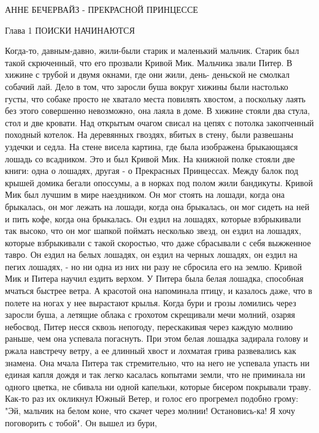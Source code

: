                                               АННЕ БЕЧЕРВАЙЗ -
                                              ПРЕКРАСНОЙ ПРИНЦЕССЕ

        Глава 1
        ПОИСКИ НАЧИНАЮТСЯ

    Когда-то, давным-давно, жили-были старик и маленький мальчик. 
Старик был такой скрюченный, что его прозвали Кривой Мик. Мальчика 
звали Питер. В хижине с трубой и двумя окнами, где они жили, день-
деньской не смолкал собачий лай. Дело в том, что заросли буша вокруг 
хижины были настолько густы, что собаке просто не хватало места 
повилять хвостом, а поскольку лаять без этого совершенно невозможно, 
она лаяла в доме.
    В хижине стояли два стула, стол и две кровати. Над открытым очагом 
свисал на цепях с потолка закопченный походный котелок. На деревянных 
гвоздях, вбитых в стену, были развешаны уздечки и седла. На стене 
висела картина, где была изображена брыкающаяся лошадь со всадником. 
Это и был Кривой Мик. На книжной полке стояли две книги: одна о 
лошадях, другая - о Прекрасных Принцессах. Между балок под крышей 
домика бегали опоссумы, а в норках под полом жили бандикуты.
    Кривой Мик был лучшим в мире наездником. Он мог стоять на лошади, 
когда она брыкалась, он мог лежать на лошади, когда она брыкалась, он 
мог сидеть на ней и пить кофе, когда она брыкалась. Он ездил на 
лошадях, которые взбрыкивали так высоко, что он мог шапкой поймать 
несколько звезд, он ездил на лошадях, которые взбрыкивали с такой 
скоростью, что даже сбрасывали с себя выжженное тавро. Он ездил на 
белых лошадях, он ездил на черных лошадях, он ездил на пегих лошадях, 
- но ни одна из них ни разу не сбросила его на землю. Кривой Мик и 
Питера научил ездить верхом.
    У Питера была белая лошадка, способная мчаться быстрее ветра. А 
красотой она напоминала птицу, и казалось даже, что в полете на ногах 
у нее вырастают крылья. Когда бури и грозы ломились через заросли 
буша, а летящие облака с грохотом скрещивали мечи молний, озаряя 
небосвод, Питер несся сквозь непогоду, перескакивая через каждую 
молнию раньше, чем она успевала погаснуть. При этом белая лошадка 
задирала голову и ржала навстречу ветру, а ее длинный хвост и лохматая 
грива развевались как знамена. Она мчала Питера так стремительно, что 
на него не успевала упасть ни единая капля дождя и так легко касалась 
копытами земли, что не приминала ни одного цветка, не сбивала ни одной 
капельки, которые бисером покрывали траву.
    Как-то раз их окликнул Южный Ветер, и голос его прогремел подобно 
грому: "Эй, мальчик на белом коне, что скачет через молнии! 
Остановись-ка! Я хочу поговорить с тобой". Он вышел из бури, 
